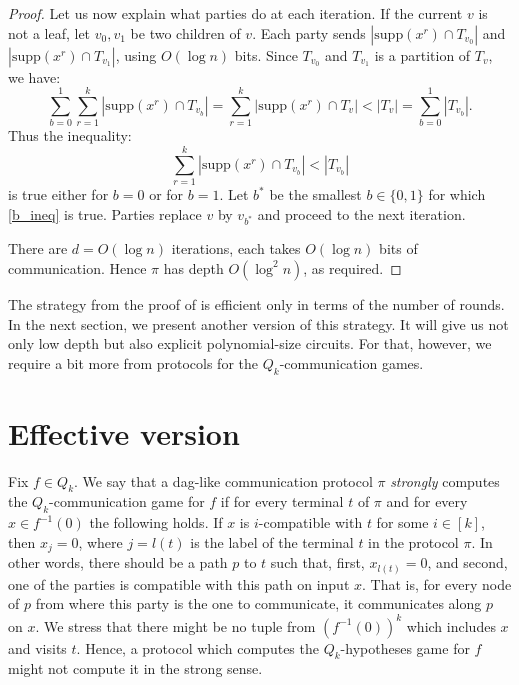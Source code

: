 \documentclass{toc}
\begin{document}
\begin{proof}
Let us now explain what parties do at each iteration. If the current $v$ is not a leaf,  let $v_0, v_1$ be two children of $v$. Each party sends $\left|\mathrm{supp}(x^r) \cap T_{v_0}\right|$ and $\left|\mathrm{supp}(x^r) \cap T_{v_1}\right|$, using $O(\log n)$ bits. Since $T_{v_0}$ and $T_{v_1}$ is a partition of $T_v$, we have:
\[
 \sum\limits_{b = 0}^1 \sum\limits_{r = 1}^k \left|\mathrm{supp}(x^r) \cap T_{v_b}\right| = \sum\limits_{r = 1}^k \left|\mathrm{supp}(x^r) \cap T_v\right| < |T_v| = \sum\limits_{b = 0}^1 |T_{v_b}|.
\]
Thus the inequality:
\begin{equation}
\label{b_ineq}
\sum\limits_{r = 1}^k \left|\mathrm{supp}(x^r) \cap T_{v_b}\right| < |T_{v_b}|
\end{equation}
is true either for $b = 0$ or for $b = 1$. Let $b^*$ be the smallest $b\in\{0, 1\}$ for which \eqref{b_ineq} is true. Parties replace $v$ by $v_{b^*}$ and proceed to the next iteration.

There are $d = O(\log n)$ iterations, each takes $O(\log n)$ bits of communication. Hence $\pi$
%
has depth $O(\log^2 n)$, as required. %
\end{proof}



\begin{remark}
The strategy from the proof of  is efficient only in terms of the number of rounds. 
In the next section, we present another version of this strategy. 
It will give us not only %
low depth  %
but also explicit polynomial-size circuits.  For that, however, we require a bit more from protocols for the $Q_k$-communication games. 
\end{remark}


 


\section{Effective version} \label{sec:effective}

Fix $f\in Q_k$. We say that a dag-like communication protocol $\pi$ \emph{strongly} computes the $Q_k$-communication game for $f$ if for every terminal $t$ of $\pi$ and for every $x\in f^{-1}(0)$ the following holds. If $x$ is $i$-compatible with $t$ for some $i\in[k]$, then $x_j = 0$, where $j = l(t)$ is the label of the terminal $t$ in the protocol $\pi$. In other words, there should be a  path $p$ to $t$ such that, first, $x_{l(t)} = 0$, and second, one of the parties is  compatible with this path on input $x$. That is, for every node of $p$ from where this party is the one to communicate, it communicates along $p$ on $x$. We stress that there might be no tuple from $(f^{-1}(0))^k$ which includes $x$ and visits $t$. Hence, a protocol which computes the $Q_k$-hypotheses game for $f$ might not compute it in the strong sense. 
\end{document}
